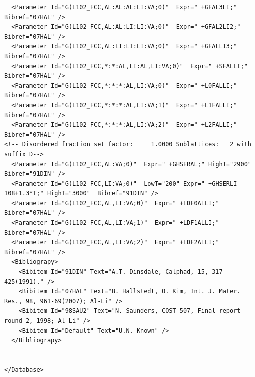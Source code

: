 \documentclass{article}
\begin{document}
\begin{appendices}
\begin{verbatim}
  <Parameter Id="G(L102_FCC,AL:AL:AL:LI:VA;0)"  Expr=" +GFAL3LI;"  Bibref="07HAL" />
  <Parameter Id="G(L102_FCC,AL:AL:LI:LI:VA;0)"  Expr=" +GFAL2LI2;"  Bibref="07HAL" />
  <Parameter Id="G(L102_FCC,AL:LI:LI:LI:VA;0)"  Expr=" +GFALLI3;"  Bibref="07HAL" />
  <Parameter Id="G(L102_FCC,*:*:AL,LI:AL,LI:VA;0)"  Expr=" +SFALLI;"  Bibref="07HAL" />
  <Parameter Id="G(L102_FCC,*:*:*:AL,LI:VA;0)"  Expr=" +L0FALLI;"  Bibref="07HAL" />
  <Parameter Id="G(L102_FCC,*:*:*:AL,LI:VA;1)"  Expr=" +L1FALLI;"  Bibref="07HAL" />
  <Parameter Id="G(L102_FCC,*:*:*:AL,LI:VA;2)"  Expr=" +L2FALLI;"  Bibref="07HAL" />
<!-- Disordered fraction set factor:     1.0000 Sublattices:   2 with suffix D-->
  <Parameter Id="G(L102_FCC,AL:VA;0)"  Expr=" +GHSERAL;" HighT="2900"  Bibref="91DIN" />
  <Parameter Id="G(L102_FCC,LI:VA;0)"  LowT="200" Expr=" +GHSERLI-108+1.3*T;" HighT="3000"  Bibref="91DIN" />
  <Parameter Id="G(L102_FCC,AL,LI:VA;0)"  Expr=" +LDF0ALLI;"  Bibref="07HAL" />
  <Parameter Id="G(L102_FCC,AL,LI:VA;1)"  Expr=" +LDF1ALLI;"  Bibref="07HAL" />
  <Parameter Id="G(L102_FCC,AL,LI:VA;2)"  Expr=" +LDF2ALLI;"  Bibref="07HAL" />
  <Bibliograpy>
    <Bibitem Id="91DIN" Text="A.T. Dinsdale, Calphad, 15, 317-425(1991)." /> 
    <Bibitem Id="07HAL" Text="B. Hallstedt, O. Kim, Int. J. Mater. Res., 98, 961-69(2007); Al-Li" /> 
    <Bibitem Id="98SAU2" Text="N. Saunders, COST 507, Final report round 2, 1998; Al-Li" /> 
    <Bibitem Id="Default" Text="U.N. Known" /> 
  </Bibliograpy>


</Database>
\end{verbatim}

\end{appendices}
\end{document}

